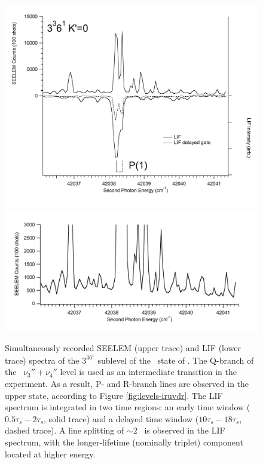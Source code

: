 \documentclass[12pt]{mitthesis}
\begin{document}
\begin{figure}
  \caption{Simultaneously recorded SEELEM (upper trace) and LIF (lower
    trace) spectra of the $3^36^1$  sublevel of the \astate\
    state of .  The Q-branch of the \xstate\ $\nu_3'' +
    \nu_4''$ level is used as an intermediate transition in the
    experiment.  As a result, P- and R-branch lines are observed in
    the upper state, according to Figure \ref{fig:levels-iruvdr}.  The
    LIF spectrum is integrated in two time regions: an early time
    window ($0.5\tau_s-2\tau_s$, solid trace) and a delayed time
    window ($10\tau_s-18\tau_s$, dashed trace).  A line splitting of
    $\sim 2$ \rcm\ is observed in the LIF spectrum, with the
    longer-lifetime (nominally triplet) component located at higher
    energy.}
  \label{fig:3361-p1}
  \centering
  \includegraphics[width=5.8in]{spectrum-3361-p1-primed}
  \includegraphics[width=6in]{spectrum-3361-p1-zoom}
\end{figure}
\end{document}
